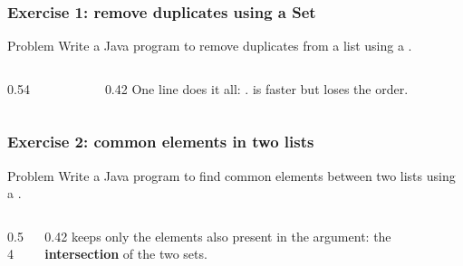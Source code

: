 \documentclass[aspectratio=169,10pt,compress]{beamer}
\begin{document}
\begin{frame}[t,fragile] \frametitle{Exercise 1: remove duplicates using a Set}
  \begin{block}{Problem}
    Write a Java program to remove duplicates from a list using a .
  \end{block}
  \begin{columns}[T]
    \begin{column}{0.54\textwidth}
    \end{column}
    \begin{column}{0.42\textwidth}
      \small
      One line does it all:
      .
       is faster but loses the order.
    \end{column}
  \end{columns}
\end{frame}




\begin{frame}[t,fragile] \frametitle{Exercise 2: common elements in two lists}
  \begin{block}{Problem}
    Write a Java program to find common elements between two lists using a .
  \end{block}
  \begin{columns}[T]
    \begin{column}{0.54\textwidth}
    \end{column}
    \begin{column}{0.42\textwidth}
      \small
       keeps only the elements also present in the
      argument: the \textbf{intersection} of the two sets.
    \end{column}
  \end{columns}
\end{frame}

\end{document}
